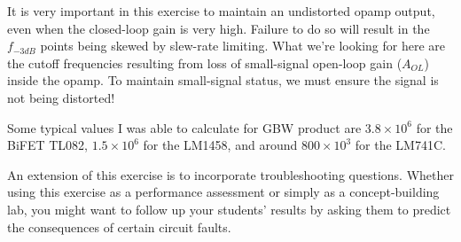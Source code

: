 It is very important in this exercise to maintain an undistorted opamp output, even when the closed-loop gain is very high.  Failure to do so will result in the $f_{-3dB}$ points being skewed by slew-rate limiting.  What we're looking for here are the cutoff frequencies resulting from loss of small-signal open-loop gain ($A_{OL}$) inside the opamp.  To maintain small-signal status, we must ensure the signal is not being distorted!

Some typical values I was able to calculate for GBW product are $3.8 \times 10^6$ for the BiFET TL082, $1.5 \times 10^6$ for the LM1458, and around $800 \times 10^3$ for the LM741C.

An extension of this exercise is to incorporate troubleshooting questions.  Whether using this exercise as a performance assessment or simply as a concept-building lab, you might want to follow up your students' results by asking them to predict the consequences of certain circuit faults.




